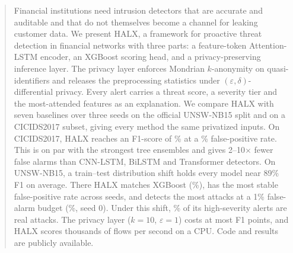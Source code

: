 \begin{abstract}
Financial institutions need intrusion detectors that are accurate and
auditable and that do not themselves become a channel for leaking customer
data. We present HALX, a framework for proactive threat detection in
financial networks with three parts: a feature-token Attention-LSTM
encoder, an XGBoost scoring head, and a privacy-preserving inference layer.
The privacy layer enforces Mondrian $k$-anonymity on quasi-identifiers and
releases the preprocessing statistics under $(\varepsilon,\delta)$-differential
privacy. Every alert carries a threat score, a severity tier and the
most-attended features as an explanation. We compare HALX with seven
baselines over three seeds on the official UNSW-NB15 split and on a
CICIDS2017 subset, giving every method the same privatized inputs. On
CICIDS2017, HALX reaches an F1-score of \cicHALXfOne\% at a
\cicHALXfpr\% false-positive rate. This is on par with the strongest tree
ensembles and gives 2--10$\times$ fewer false alarms than CNN-LSTM, BiLSTM
and Transformer detectors. On UNSW-NB15, a train--test distribution shift
holds every model near 89\% F1 on average. There HALX matches XGBoost
(\unswHALXfOne\%), has the most stable false-positive rate across seeds,
and detects the most attacks at a 1\% false-alarm budget
(\unswHALXtprOne\%, seed 0). Under this shift,
\unswsevhigh\% of its high-severity alerts are real attacks. The privacy
layer ($k{=}10$, $\varepsilon{=}1$) costs at most \PRIVCOSTMAX{} F1 points,
and HALX scores thousands of flows per second on a CPU. Code and results
are publicly available.
\end{abstract}
